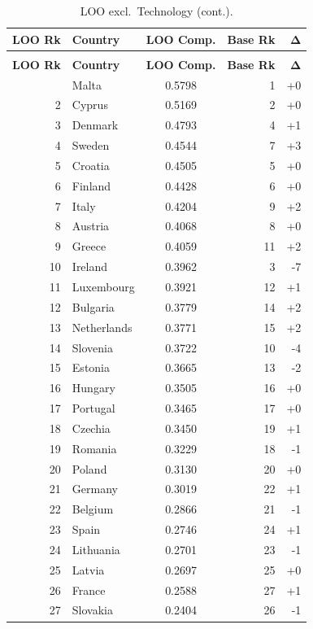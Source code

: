 \begin{longtable}{@{}rl S[table-format=1.4] r r@{}}
\caption{LOO ranking excluding Technology.  Spearman $\rho = 0.9683$, Kendall $\tau = 0.8860$.}
\label{tab:loo-technology}\\
\toprule
{\textbf{LOO Rk}} & {\textbf{Country}} & {\textbf{LOO Comp.}} & {\textbf{Base Rk}} & {$\boldsymbol{\Delta}$} \\
\midrule
\endfirsthead
\caption[]{LOO excl.\ Technology (cont.).}\\
\toprule
{\textbf{LOO Rk}} & {\textbf{Country}} & {\textbf{LOO Comp.}} & {\textbf{Base Rk}} & {$\boldsymbol{\Delta}$} \\
\midrule
\endhead
\bottomrule
{} & Malta & 0.5798 & 1 & +0 \\
  2 & Cyprus & 0.5169 & 2 & +0 \\
  3 & Denmark & 0.4793 & 4 & +1 \\
  4 & Sweden & 0.4544 & 7 & +3 \\
  5 & Croatia & 0.4505 & 5 & +0 \\
  6 & Finland & 0.4428 & 6 & +0 \\
  7 & Italy & 0.4204 & 9 & +2 \\
  8 & Austria & 0.4068 & 8 & +0 \\
  9 & Greece & 0.4059 & 11 & +2 \\
  10 & Ireland & 0.3962 & 3 & -7 \\
  11 & Luxembourg & 0.3921 & 12 & +1 \\
  12 & Bulgaria & 0.3779 & 14 & +2 \\
  13 & Netherlands & 0.3771 & 15 & +2 \\
  14 & Slovenia & 0.3722 & 10 & -4 \\
  15 & Estonia & 0.3665 & 13 & -2 \\
  16 & Hungary & 0.3505 & 16 & +0 \\
  17 & Portugal & 0.3465 & 17 & +0 \\
  18 & Czechia & 0.3450 & 19 & +1 \\
  19 & Romania & 0.3229 & 18 & -1 \\
  20 & Poland & 0.3130 & 20 & +0 \\
  21 & Germany & 0.3019 & 22 & +1 \\
  22 & Belgium & 0.2866 & 21 & -1 \\
  23 & Spain & 0.2746 & 24 & +1 \\
  24 & Lithuania & 0.2701 & 23 & -1 \\
  25 & Latvia & 0.2697 & 25 & +0 \\
  26 & France & 0.2588 & 27 & +1 \\
  27 & Slovakia & 0.2404 & 26 & -1 \\
\end{longtable}